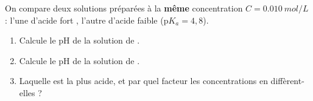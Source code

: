 \documentclass[11pt,a4paper]{article}
\begin{document}
\begin{exo}
On compare deux solutions préparées à la \textbf{même} concentration $C = \qty{0,010}{mol\per L}$ : l'une
d'acide fort , l'autre d'acide faible  ($\mathrm{p}K_a = 4{,}8$).
\begin{enumerate}[label=\alph*)]
  \item Calcule le pH de la solution de .
  \item Calcule le pH de la solution de .
  \item Laquelle est la plus acide, et par quel facteur les concentrations en  diffèrent-elles ?
\end{enumerate}
\end{exo}
\end{document}
